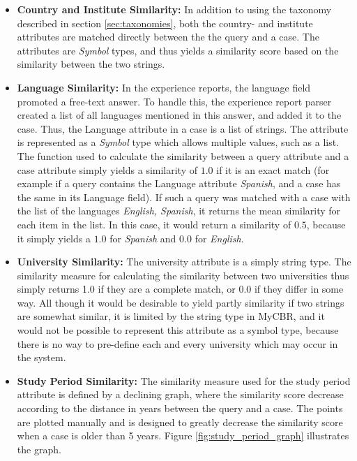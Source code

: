 \begin{itemize}
    \item \textbf{Country and Institute Similarity:} In addition to using the taxonomy described in section \ref{sec:taxonomies}, both the country- and institute attributes are matched directly between the the query and a case. The attributes are \emph{Symbol} types, and thus yields a similarity score based on the similarity between the two strings.
    
    \item \textbf{Language Similarity:} In the experience reports, the language field promoted a free-text answer. To handle this, the experience report parser created a list of all languages mentioned in this answer, and added it to the case. Thus, the Language attribute in a case is a list of strings. The attribute is represented as a \emph{Symbol} type which allows multiple values, such as a list. The function used to calculate the similarity between a query attribute and a case attribute simply yields a similarity of $1.0$ if it is an exact match (for example if a query contains the Language attribute \emph{Spanish}, and a case has the same in its Language field). If such a query was matched with a case with the list of the languages \emph{English, Spanish}, it returns the mean similarity for each item in the list. In this case, it would return a similarity of $0.5$, because it simply yields a $1.0$ for \emph{Spanish} and $0.0$ for \emph{English}.
    
    \item \textbf{University Similarity:} The university attribute is a simply string type. The similarity measure for calculating the similarity between two universities thus simply returns 1.0 if they are a complete match, or 0.0 if they differ in some way. All though it would be desirable to yield partly similarity if two strings are somewhat similar, it is limited by the string type in MyCBR, and it would not be possible to represent this attribute as a symbol type, because there is no way to pre-define each and every university which may occur in the system. 
    
    \item \textbf{Study Period Similarity:} The similarity measure used for the study period attribute is defined by a declining graph, where the similarity score decrease according to the distance in years between the query and a case. The points are plotted manually and is designed to greatly decrease the similarity score when a case is older than 5 years. Figure \ref{fig:study_period_graph} illustrates the graph.
    

\end{itemize}
